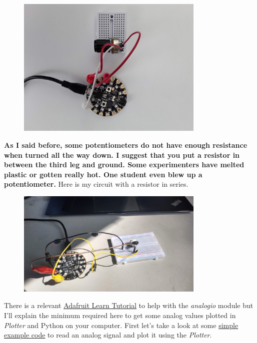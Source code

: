 \begin{figure}[H]
  \begin{center}
    \includegraphics[width=0.8\textwidth]{Figures/potentiometer1.jpeg}
  \end{center}
\end{figure}
{\bf As I said before, some potentiometers do not have enough resistance when turned all the way down. I suggest that you put a resistor in between the third leg and ground. Some experimenters have melted plastic or gotten really hot. One student even blew up a potentiometer.} Here is my circuit with a resistor in series.
\begin{figure}[H]
  \begin{center}
    \includegraphics[angle=180,width=0.8\textwidth]{Figures/Potentiometer_Alternate.jpg}
  \end{center}
\end{figure}
There is a relevant \href{https://learn.adafruit.com/adafruit-circuit-playground-express/circuitpython-analog-in}{Adafruit Learn Tutorial} to help with the {\it analogio} module but I’ll explain the minimum required here to get some analog values plotted in {\it Plotter} and Python on your computer. First let’s take a look at some \href{https://github.com/cmontalvo251/Microcontrollers/blob/master/Circuit_Playground/CircuitPython/Analog/analog_simple.py}{simple example code} to read an analog signal and plot it using the {\it Plotter}.
